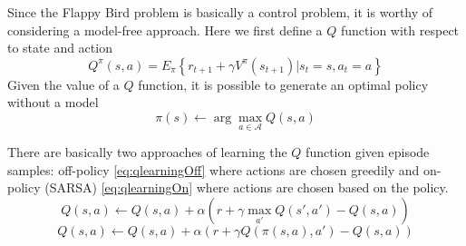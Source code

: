 \documentclass[conference,compsoc]{IEEEtran}
\begin{document}
Since the Flappy Bird problem is basically a control problem, it is worthy of considering a model-free approach. Here we first define a $Q$ function with respect to state and action 
\begin{equation}
Q^{\pi} (s,a) = E_{\pi} \left\{ r_{t+1} +\gamma V^{\pi}(s_{t+1}) | s_t =s, a_t=a\right\}
\end{equation}
Given the value of a $Q$ function, it is possible to generate an optimal policy without a model
\begin{equation}
\pi(s) \leftarrow \arg \max_{a\in \mathcal{A}} Q(s,a)
\end{equation}

There are basically two approaches of learning the $Q$ function given episode samples: off-policy \eqref{eq:qlearningOff} where actions are chosen greedily and on-policy (SARSA) \eqref{eq:qlearningOn} where actions are chosen based on the policy.
\begin{equation}\label{eq:qlearningOff}
Q(s,a) \leftarrow Q(s,a) + \alpha \left(r+\gamma \max_{a'} Q(s',a')-Q(s,a) \right)
\end{equation}
\begin{equation}\label{eq:qlearningOn}
Q(s,a) \leftarrow Q(s,a) + \alpha \left(r+\gamma Q(\pi(s,a),a')-Q(s,a) \right)
\end{equation}


%
%

\end{document}

